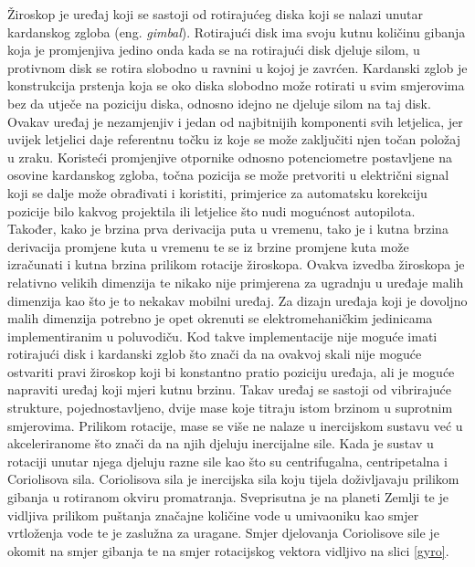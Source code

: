 \documentclass[times, utf8, diplomski]{fer}
\begin{document}
Žiroskop je uređaj koji se sastoji od rotirajućeg diska koji se nalazi unutar kardanskog zgloba (eng. \textit{gimbal}). Rotirajući
disk ima svoju kutnu količinu gibanja koja je promjenjiva jedino onda kada se na rotirajući disk djeluje silom, u protivnom
disk se rotira slobodno u ravnini u kojoj je zavrćen. Kardanski zglob je konstrukcija prstenja koja se oko diska
slobodno može rotirati u svim smjerovima bez da utječe na poziciju diska, odnosno idejno ne djeluje silom na taj disk. Ovakav uređaj
je nezamjenjiv i jedan od najbitnijih komponenti svih letjelica, jer uvijek letjelici daje referentnu točku iz koje se može
zaključiti njen točan položaj u zraku. Koristeći promjenjive otpornike odnosno potenciometre postavljene na osovine kardanskog zgloba,
točna pozicija se može pretvoriti u električni signal koji se dalje može obrađivati i koristiti, primjerice za
automatsku korekciju pozicije bilo kakvog projektila ili letjelice što nudi mogućnost autopilota. Također, kako je brzina prva
derivacija puta u vremenu, tako je i kutna brzina derivacija promjene kuta u vremenu te se iz brzine promjene kuta može izračunati
i kutna brzina prilikom rotacije žiroskopa. Ovakva izvedba žiroskopa je
relativno velikih dimenzija te nikako nije primjerena za ugradnju u uređaje malih dimenzija kao što je to nekakav mobilni uređaj.
Za dizajn uređaja koji je dovoljno malih dimenzija potrebno je opet okrenuti se elektromehaničkim jedinicama implementiranim u poluvodiču.
Kod takve implementacije nije moguće imati rotirajući disk i kardanski zglob što znači da na ovakvoj skali nije moguće ostvariti 
pravi žiroskop koji bi konstantno pratio poziciju uređaja, ali je moguće napraviti uređaj koji mjeri kutnu brzinu.
Takav uređaj se sastoji od vibrirajuće strukture, pojednostavljeno, dvije mase koje titraju istom brzinom u suprotnim smjerovima.
Prilikom rotacije, mase se više ne nalaze u inercijskom sustavu već u akceleriranome što znači da na njih djeluju inercijalne sile.
Kada je sustav u rotaciji unutar njega djeluju razne sile kao što su centrifugalna, centripetalna i Coriolisova sila.
Coriolisova sila je inercijska sila koju tijela doživljavaju prilikom gibanja u rotiranom okviru promatranja. Sveprisutna je na 
planeti Zemlji te je vidljiva prilikom puštanja značajne količine vode u umivaoniku kao smjer vrtloženja vode te je zaslužna za
uragane. Smjer djelovanja Coriolisove sile je okomit na smjer gibanja te na smjer rotacijskog vektora vidljivo na slici \ref{gyro}.
\end{document}
